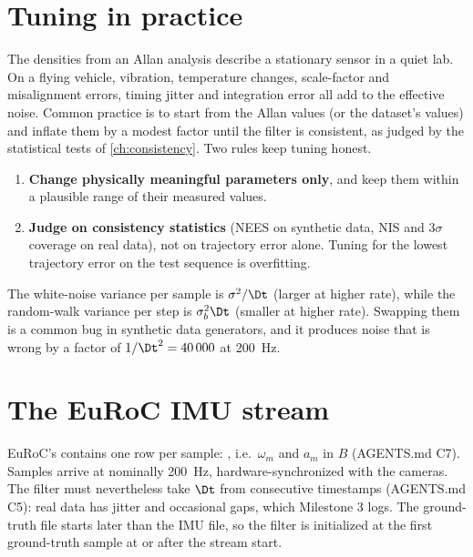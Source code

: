 \section{Tuning in practice}

The densities from an Allan analysis describe a stationary sensor in a quiet lab. On a flying vehicle,
vibration, temperature changes, scale-factor and misalignment errors, timing jitter and integration error
all add to the effective noise. Common practice is to start from the Allan values (or the dataset's values)
and inflate them by a modest factor until the filter is consistent, as judged by the statistical tests of
\cref{ch:consistency}. Two rules keep tuning honest.
\begin{enumerate}
  \item \textbf{Change physically meaningful parameters only}, and keep them within a plausible range of
        their measured values.
  \item \textbf{Judge on consistency statistics} (NEES on synthetic data, NIS and $3\sigma$ coverage on real data),
        not on trajectory error alone. Tuning for the lowest trajectory error on the test sequence is
        overfitting.
\end{enumerate}

\begin{pitfall}
The white-noise variance per sample is $\sigma^2/\Dt$ (larger at higher rate), while the random-walk variance per
step is $\sigma_b^2\Dt$ (smaller at higher rate). Swapping them is a common bug in synthetic data generators,
and it produces noise that is wrong by a factor of $1/\Dt^2 = 40\,000$ at 200~Hz.
\end{pitfall}

\section{The EuRoC IMU stream}

EuRoC's  contains one row per sample: , i.e.\ $\omega_m$ and $a_m$ in $B$ (AGENTS.md C7). Samples arrive at
nominally 200~Hz, hardware-synchronized with the cameras. The filter must nevertheless take $\Dt$ from
consecutive timestamps (AGENTS.md C5): real data has jitter and occasional gaps, which Milestone 3 logs.
The ground-truth file starts later than the IMU file, so the filter is initialized at the first
ground-truth sample at or after the stream start.

